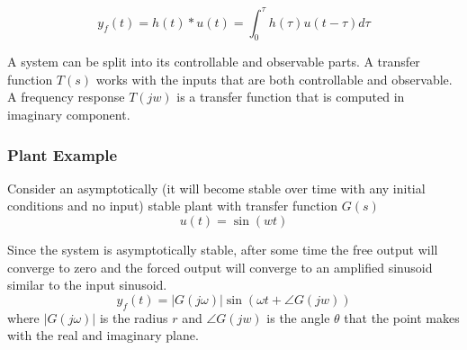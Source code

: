 \documentclass[11pt]{article}
\begin{document}
\begin{equation}
    y_f(t) = h(t) \ast u(t) = \int_{0}^{\tau} h(\tau) u(t-\tau) d \tau
\end{equation}

A system can be split into its controllable and observable parts.
A transfer function $T(s)$ works with the inputs that are both controllable and observable.
A frequency response $T(jw)$ is a transfer function that is computed in imaginary component.

\subsubsection{Plant Example}
Consider an asymptotically (it will become stable over time with any initial conditions and no input) stable plant with transfer function $G(s)$
\begin{equation}
    u(t) = \sin (wt)
\end{equation}

Since the system is asymptotically stable, after some time the free output will converge to zero and the forced output will converge to an amplified sinusoid similar to the input sinusoid.
\begin{equation}
    y_f (t) = |G(j \omega)| \sin (\omega t + \angle G(jw))
\end{equation}
where $|G(j \omega)|$ is the radius $r$ and $\angle G(jw)$ is the angle $\theta$ that the point makes with the real and imaginary plane.




\end{document}
